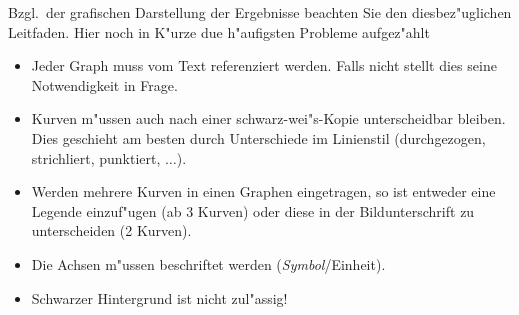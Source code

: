 \documentclass[a4paper,oneside,10pt]{article}%
\begin{document}
Bzgl.~der grafischen Darstellung der Ergebnisse beachten Sie den diesbez"uglichen Leitfaden. Hier noch in K"urze due h"aufigsten Probleme aufgez"ahlt
\begin{itemize}
\item Jeder Graph muss vom Text referenziert werden. Falls nicht stellt dies seine Notwendigkeit in Frage.
\item Kurven m"ussen auch nach einer schwarz-wei"s-Kopie unterscheidbar bleiben. Dies geschieht am besten durch Unterschiede im Linienstil (durchgezogen, strichliert, punktiert, $\ldots$).
\item Werden mehrere Kurven in einen Graphen eingetragen, so ist entweder eine Legende einzuf"ugen (ab 3 Kurven) oder diese in der Bildunterschrift zu unterscheiden (2 Kurven).
\item Die Achsen m"ussen beschriftet werden (\textit{Symbol}/Einheit).
\item Schwarzer Hintergrund ist nicht zul"assig!
\end{itemize}

	

\end{document}

